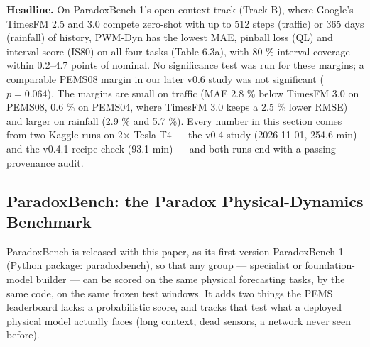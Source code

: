 \documentclass[
  10pt,
]{article}
\begin{document}
\textbf{Headline.} On ParadoxBench-1's open-context track (Track B),
where Google's TimesFM 2.5 and 3.0 compete zero-shot with up to 512
steps (traffic) or 365 days (rainfall) of history, PWM-Dyn has the
lowest MAE, pinball loss (QL) and interval score (IS80) on all four
tasks (Table 6.3a), with 80 \% interval coverage within 0.2--4.7 points
of nominal. No significance test was run for these margins; a comparable PEMS08 margin
in our later v0.6 study was not significant ($p=0.064$). The margins are small on traffic (MAE 2.8 \% below TimesFM
3.0 on PEMS08, 0.6 \% on PEMS04, where TimesFM 3.0 keeps a 2.5 \% lower
RMSE) and larger on rainfall (2.9 \% and 5.7 \%). Every number in this
section comes from two Kaggle runs on 2× Tesla T4 --- the v0.4 study
(2026-11-01, 254.6 min) and the v0.4.1 recipe check (93.1 min) --- and
both runs end with a passing provenance audit.

\subsection{ParadoxBench: the Paradox Physical-Dynamics Benchmark}

ParadoxBench is released with this paper, as its first version
ParadoxBench-1 (Python package: paradoxbench), so that any group ---
specialist or foundation-model builder --- can be scored on the same
physical forecasting tasks, by the same code, on the same frozen test
windows. It adds two things the PEMS leaderboard lacks: a probabilistic
score, and tracks that test what a deployed physical model actually
faces (long context, dead sensors, a network never seen before).
\end{document}
